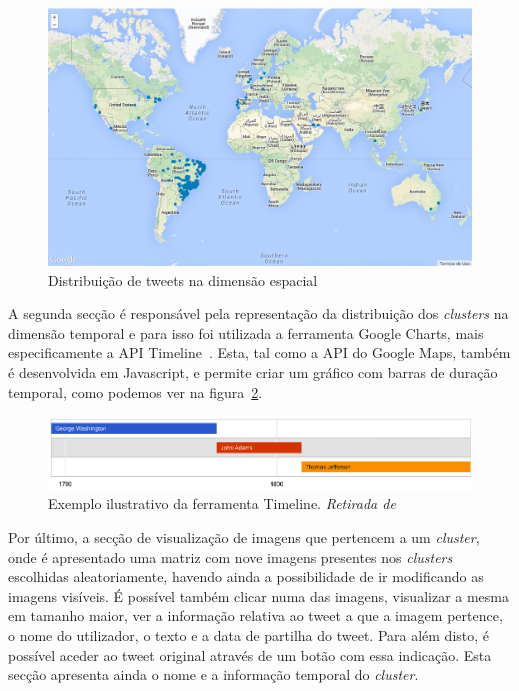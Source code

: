 \begin{figure}[h]
\centering
\includegraphics[width=1.0\linewidth]{./figures/olhopassarinho/map1.png}
\caption{Distribuição de tweets na dimensão espacial}
\label{fig:map1}
\end{figure}

A segunda secção é responsável pela representação da distribuição dos \textit{clusters} na dimensão temporal e para isso foi utilizada a ferramenta Google Charts, mais especificamente a API Timeline~\cite{googletimeline}. Esta, tal como a API do Google Maps, também é desenvolvida em Javascript, e permite criar um gráfico com barras de duração temporal, como podemos ver na figura~\ref{fig:timeex}. 

\begin{figure}[h]
\centering
\includegraphics[width=1.0\linewidth]{./figures/olhopassarinho/time_example.png}
\caption{Exemplo ilustrativo da ferramenta Timeline. \textit{Retirada de}~\cite{googletimeline}}
\label{fig:timeex}
\end{figure}

Por último, a secção de visualização de imagens que pertencem a um \textit{cluster}, onde é apresentado uma matriz com nove imagens presentes nos \textit{clusters} escolhidas aleatoriamente, havendo ainda a possibilidade de ir modificando as imagens visíveis. É possível também clicar numa das imagens, visualizar a mesma em tamanho maior, ver a informação relativa ao tweet a que a imagem pertence, o nome do utilizador, o texto e a data de partilha do tweet. Para além disto, é possível aceder ao tweet original através de um botão com essa indicação. Esta secção apresenta ainda o nome e a informação temporal do \textit{cluster}.


